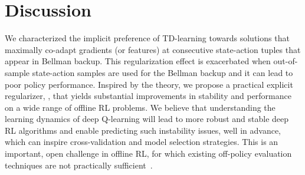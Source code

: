 \documentclass{article} %
\begin{document}
\section{Discussion} 
We characterized the implicit preference of TD-learning towards solutions that maximally co-adapt gradients (or features) at consecutive state-action tuples that appear in Bellman backup. This regularization effect is exacerbated when out-of-sample
state-action samples are used for the Bellman backup and it can lead to poor policy performance. Inspired by the theory, we propose a practical explicit regularizer, \methodname, that yields substantial improvements in stability and performance on a wide range of offline RL problems. We believe that understanding the learning dynamics of deep Q-learning will lead to more robust and stable deep RL algorithms and enable predicting such instability issues, well in advance, which can inspire cross-validation and model selection strategies. This is an important, open challenge in offline RL, for which existing off-policy evaluation techniques are not practically sufficient~\citep{fu2021benchmarks}. 

\end{document}
